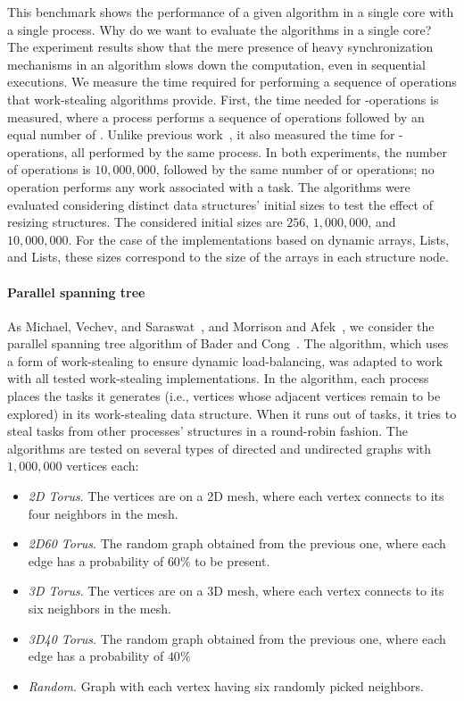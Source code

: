This benchmark shows the performance of a given algorithm in a single core with a single process. Why do we want to evaluate the algorithms in a single core? The experiment results show that the mere presence of heavy synchronization mechanisms in an algorithm slows down the computation, even in sequential executions. We measure the time required for performing a sequence of operations that work-stealing algorithms provide. First, the time needed for \Put-\Take operations is measured, where a process performs a sequence of \Put operations followed by an equal number of \Takes. Unlike previous work~\cite{maged.vechev.2009, fencefreework}, it also measured the time for \Put-\Steal operations, all performed by the same process. In both experiments, the number of \Put operations is \(10,000,000\), followed by the same number of \Take or \Steal operations; no operation performs any work associated with a task. The algorithms were evaluated considering distinct data structures' initial sizes to test the effect of resizing structures. The considered initial sizes are \(256\), \(1,000,000\), and \(10,000,000\).  For the case of the implementations based on dynamic arrays, \NCWSM Lists, and \BNCWSM Lists, these sizes correspond to the size of the arrays in each structure node.

\paragraph*{Parallel spanning tree\label{irregular-graph}}
As Michael, Vechev, and Saraswat~\cite{maged.vechev.2009}, and Morrison and Afek~\cite{fencefreework}, we consider the parallel spanning tree algorithm of Bader and Cong~\cite{1302951}. The algorithm, which uses a form of work-stealing to ensure dynamic load-balancing, was adapted to work with all tested work-stealing implementations. In the algorithm, each process places the tasks it generates (i.e., vertices whose adjacent vertices remain to be explored) in its work-stealing data structure. When it runs out of tasks, it tries to steal tasks from other processes' structures in a round-robin fashion. The algorithms are tested on several types of directed and undirected graphs with $1,000,000$ vertices each:

\begin{itemize}
    \item \textit{2D Torus}. The vertices are on a 2D mesh, where each vertex connects to its four neighbors in the mesh.
    \item \textit{2D60 Torus}. The random graph obtained from the previous one, where each edge has a probability of $60\%$
to be present.
    \item \textit{3D Torus}. The vertices are on a 3D mesh, where each vertex connects to its six neighbors in the mesh.
    \item \textit{3D40 Torus}. The random graph obtained from the previous one, where each edge has a probability of $40\%$
    \item \textit{Random}. Graph with each vertex having six randomly picked neighbors.
\end{itemize}


